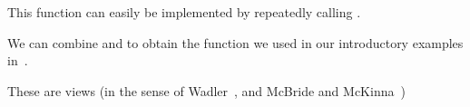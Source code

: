 
This function can easily be implemented by repeatedly calling
.







We can combine  and  to obtain
the  function we used in our introductory examples
in~.








These are views
(in the sense of Wadler~\cite{DBLP:conf/popl/Wadler87},
and McBride and McKinna~\cite{DBLP:journals/jfp/McBrideM04})
